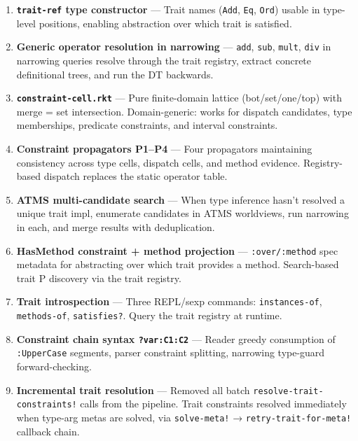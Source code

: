 \documentclass[11pt]{article}
\begin{document}
\begin{enumerate}
\item \textbf{\texttt{trait-ref} type constructor} — Trait names (\texttt{Add}, \texttt{Eq}, \texttt{Ord}) usable in type-level
positions, enabling abstraction over which trait is satisfied.

\item \textbf{Generic operator resolution in narrowing} — \texttt{add}, \texttt{sub}, \texttt{mult}, \texttt{div} in
narrowing queries resolve through the trait registry, extract concrete definitional
trees, and run the DT backwards.

\item \textbf{\texttt{constraint-cell.rkt}} — Pure finite-domain lattice (bot/set/one/top) with
merge = set intersection. Domain-generic: works for dispatch candidates, type
memberships, predicate constraints, and interval constraints.

\item \textbf{Constraint propagators P1–P4} — Four propagators maintaining consistency across
type cells, dispatch cells, and method evidence. Registry-based dispatch replaces
the static operator table.

\item \textbf{ATMS multi-candidate search} — When type inference hasn't resolved a unique trait
impl, enumerate candidates in ATMS worldviews, run narrowing in each, and merge
results with deduplication.

\item \textbf{HasMethod constraint + method projection} — \texttt{:over/:method} spec metadata for
abstracting over which trait provides a method. Search-based trait P discovery via
the trait registry.

\item \textbf{Trait introspection} — Three REPL/sexp commands: \texttt{instances-of}, \texttt{methods-of},
\texttt{satisfies?}. Query the trait registry at runtime.

\item \textbf{Constraint chain syntax \texttt{?var:C1:C2}} — Reader greedy consumption of \texttt{:UpperCase}
segments, parser constraint splitting, narrowing type-guard forward-checking.

\item \textbf{Incremental trait resolution} — Removed all batch \texttt{resolve-trait-constraints!}
calls from the pipeline. Trait constraints resolved immediately when type-arg
metas are solved, via \texttt{solve-meta!} → \texttt{retry-trait-for-meta!} callback chain.
\end{enumerate}
\end{document}
